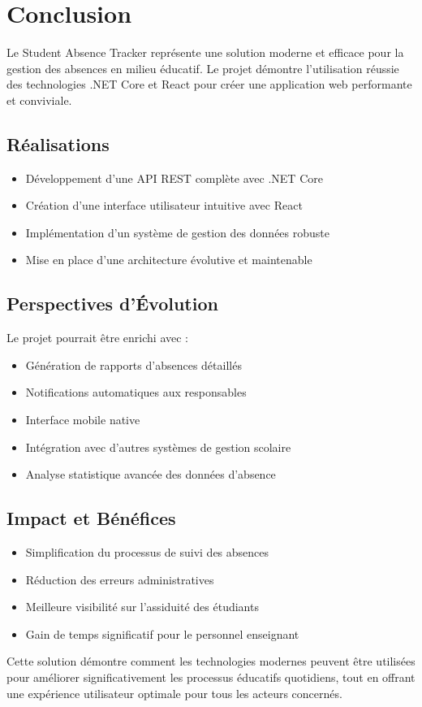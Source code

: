 \section{Conclusion}
\label{sec:conclusion}

Le Student Absence Tracker représente une solution moderne et efficace pour la gestion des absences en milieu éducatif. Le projet démontre l'utilisation réussie des technologies .NET Core et React pour créer une application web performante et conviviale.

\subsection{Réalisations}
\begin{itemize}
    \item Développement d'une API REST complète avec .NET Core
    \item Création d'une interface utilisateur intuitive avec React
    \item Implémentation d'un système de gestion des données robuste
    \item Mise en place d'une architecture évolutive et maintenable
\end{itemize}

\subsection{Perspectives d'Évolution}
Le projet pourrait être enrichi avec :
\begin{itemize}
    \item Génération de rapports d'absences détaillés
    \item Notifications automatiques aux responsables
    \item Interface mobile native
    \item Intégration avec d'autres systèmes de gestion scolaire
    \item Analyse statistique avancée des données d'absence
\end{itemize}

\subsection{Impact et Bénéfices}
\begin{itemize}
    \item Simplification du processus de suivi des absences
    \item Réduction des erreurs administratives
    \item Meilleure visibilité sur l'assiduité des étudiants
    \item Gain de temps significatif pour le personnel enseignant
\end{itemize}

Cette solution démontre comment les technologies modernes peuvent être utilisées pour améliorer significativement les processus éducatifs quotidiens, tout en offrant une expérience utilisateur optimale pour tous les acteurs concernés.

